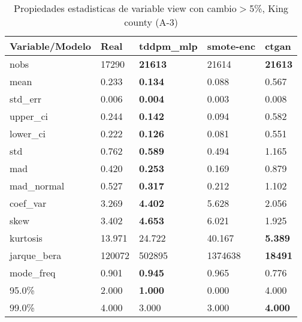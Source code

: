 \begin{table}[H]
\centering
\fontsize{8}{14}\selectfont
\caption{Propiedades estadisticas de variable view con cambio\ensuremath{>}5\%, King county (A-3)}
\label{table-stats-king county-a-3-view-short}
\begin{tabular}{|l|m{10em}|m{10em}|m{10em}|m{10em}|}
\hline
 \rowcolor[gray]{0.8}
Variable/Modelo & Real & tddpm\_mlp & smote-enc & ctgan \\
\hline nobs & 17290 & \bfseries 21613 & \cellcolor[rgb]{0.9, 0.54, 0.52} 21614 & \bfseries 21613 \\
\hline mean & 0.233 & \bfseries 0.134 & 0.088 & \cellcolor[rgb]{0.9, 0.54, 0.52} 0.567 \\
\hline std\_err & 0.006 & \bfseries 0.004 & \cellcolor[rgb]{0.9, 0.54, 0.52} 0.003 & 0.008 \\
\hline upper\_ci & 0.244 & \bfseries 0.142 & 0.094 & \cellcolor[rgb]{0.9, 0.54, 0.52} 0.582 \\
\hline lower\_ci & 0.222 & \bfseries 0.126 & 0.081 & \cellcolor[rgb]{0.9, 0.54, 0.52} 0.551 \\
\hline std & 0.762 & \bfseries 0.589 & 0.494 & \cellcolor[rgb]{0.9, 0.54, 0.52} 1.165 \\
\hline mad & 0.420 & \bfseries 0.253 & 0.169 & \cellcolor[rgb]{0.9, 0.54, 0.52} 0.879 \\
\hline mad\_normal & 0.527 & \bfseries 0.317 & 0.212 & \cellcolor[rgb]{0.9, 0.54, 0.52} 1.102 \\
\hline coef\_var & 3.269 & \bfseries 4.402 & \cellcolor[rgb]{0.9, 0.54, 0.52} 5.628 & 2.056 \\
\hline skew & 3.402 & \bfseries 4.653 & \cellcolor[rgb]{0.9, 0.54, 0.52} 6.021 & 1.925 \\
\hline kurtosis & 13.971 & 24.722 & \cellcolor[rgb]{0.9, 0.54, 0.52} 40.167 & \bfseries 5.389 \\
\hline jarque\_bera & 120072 & 502895 & \cellcolor[rgb]{0.9, 0.54, 0.52} 1374638 & \bfseries 18491 \\
\hline mode\_freq & 0.901 & \bfseries 0.945 & 0.965 & \cellcolor[rgb]{0.9, 0.54, 0.52} 0.776 \\
\hline 95.0\% & 2.000 & \bfseries 1.000 & \cellcolor[rgb]{0.9, 0.54, 0.52} 0.000 & \cellcolor[rgb]{0.9, 0.54, 0.52} 4.000 \\
\hline 99.0\% & 4.000 & \cellcolor[rgb]{0.9, 0.54, 0.52} 3.000 & \cellcolor[rgb]{0.9, 0.54, 0.52} 3.000 & \bfseries 4.000 \\
\hline
\end{tabular}
\end{table}
